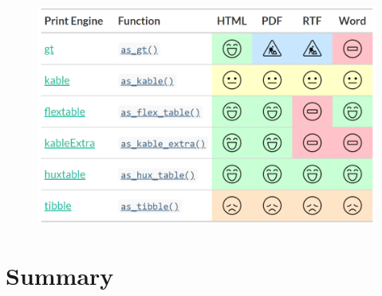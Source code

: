 \begin{figure}[h!]
  \includegraphics[scale=0.28]{print_engines.png}
  \centering
\end{figure}

\section{Summary}



\address{Daniel D. Sjoberg\\
  Memorial Sloan Kettering Cancer Center\\
  1275 York Ave., New York, New York 10022\\
  USA\\
  ORCiD: 0000-0003-0862-2018\\
  }

\address{Karissa Whiting\\
  Memorial Sloan Kettering Cancer Center\\
  1275 York Ave., New York, New York 10022\\
  USA\\
  ORCiD: 0000-0002-4683-1868\\
  }

\address{Michael Curry\\
  Memorial Sloan Kettering Cancer Center\\
  1275 York Ave., New York, New York 10022\\
  USA\\
  ORCiD: 0000-0002-0261-4044\\
  }
